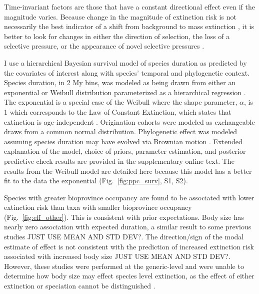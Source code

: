 \documentclass[12pt]{article}
\begin{document}
Time-invariant factors are those that have a constant directional effect even if the magnitude varies. Because change in the magnitude of extinction risk is not necessarily the best indicator of a shift from background to mass extinction \cite{Wang2003}, it is better to look for changes in either the direction of selection, the loss of a selective pressure, or the appearance of novel selective pressures \cite{Jablonski1986}.

I use a hierarchical Bayesian survival model of species duration as predicted by the covariates of interest along with species' temporal and phylogenetic context. Species duration, in 2 My bins, was modeled as being drawn from either an exponential or Weibull distribution parameterized as a hierarchical regression \cite{Gelman2013d}. The exponential is a special case of the Weibull where the shape parameter, $\alpha$, is 1 which corresponds to the Law of Constant Extinction, which states that extinction is age-independent \cite{VanValen1973}. Origination cohorts were modeled as exchangeable draws from a common normal distribution. Phylogenetic effect was modeled assuming species duration may have evolved via Brownian motion \cite{Housworth2004}. Extended explanation of the model, choice of priors, parameter estimation, and posterior predictive check results are provided in the supplementary online text. The results from the Weibull model are detailed here because this model has a better fit to the data the exponential (Fig.~\ref{fig:ppc_surv}, S1, S2).

Species with greater bioprovince occupancy are found to be associated with lower extinction risk than taxa with smaller bioprovince occupancy (Fig.~\ref{fig:eff_other}). This is consistent with prior expectations. Body size has nearly zero association with expected duration, a similar result to some previous studies \cite{Tomiya2013} \uppercase{just use mean and std dev?}. The direction/sign of the modal estimate of effect is not consistent with the prediction of increased extinction risk associated with increased body size \cite{Liow2008} \uppercase{just use mean and std dev?}. However, these studies were performed at the generic-level and were unable to determine how body size may effect species level extinction, as the effect of either extinction or speciation cannot be distinguished \cite{Tomiya2013,Liow2008}.
\end{document}
